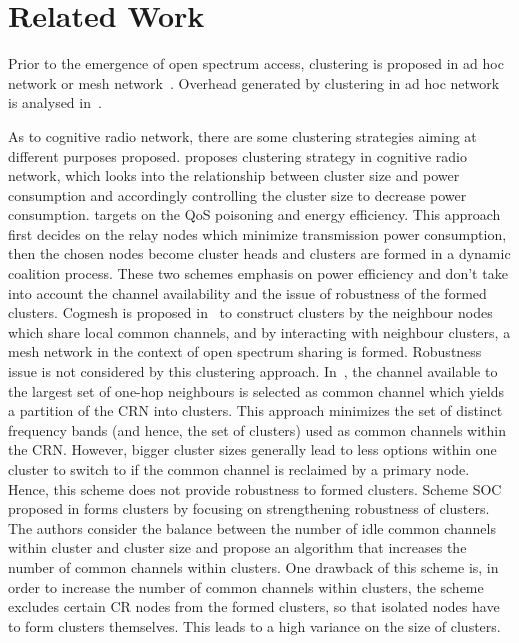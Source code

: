 \section{Related Work}
\label{related_work}

Prior to the emergence of open spectrum access, clustering is proposed in ad hoc network or mesh network~\cite{Abbasi_survey_07}. 
Overhead generated by clustering in ad hoc network is analysed in~\cite{clusterRoutingOverhead02infocom, clusterRoutingOverhead_wcnc04}.

As to cognitive radio network, there are some clustering strategies aiming at different purposes proposed.
\cite{clustering_globecom11} proposes clustering strategy in cognitive radio network, which looks into the relationship between cluster size and power consumption and accordingly controlling the cluster size to decrease power consumption.
\cite{TWC2012_cooperative_communication} targets on the QoS poisoning and energy efficiency. 
This approach first decides on the relay nodes which minimize transmission power consumption, then the chosen nodes become cluster heads and clusters are formed in a dynamic coalition process.
These two schemes emphasis on power efficiency and don't take into account the channel availability and the issue of robustness of the formed clusters.
Cogmesh is proposed in~\cite{Chen07} to construct clusters by the neighbour nodes which share local common channels, and by interacting with neighbour clusters, a mesh network in the context of open spectrum sharing is formed.
Robustness issue is not considered by this clustering approach.
In~\cite{Zhao07}, the channel available to the largest set of one-hop neighbours is selected as common channel which yields a partition of the CRN into clusters. 
This approach minimizes the set of distinct frequency bands (and hence, the set of clusters) used as common channels within the CRN.
However, bigger cluster sizes generally lead to less options within one cluster to switch to if the common channel is reclaimed by a primary node. 
Hence, this scheme does not provide robustness to formed clusters. 
Scheme SOC proposed in \cite{Lazos09} forms clusters by focusing on strengthening robustness of clusters.
The authors consider the balance between the number of idle common channels within cluster and cluster size and propose an algorithm that increases the number of common channels within clusters. 
One drawback of this scheme is, in order to increase the number of common channels within clusters, the scheme excludes certain CR nodes from the formed clusters, so that isolated nodes have to form clusters themselves. 
This leads to a high variance on the size of clusters.



